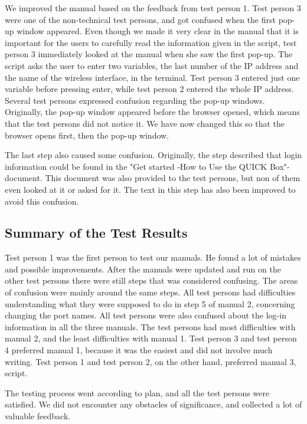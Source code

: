 We improved the manual based on the feedback from test person 1. Test person 3 were one of the non-technical test persons, and got confused when the first pop-up window appeared. Even though we made it very clear in the manual that it is important for the users to carefully read the information given in the script, test person 3 immediately looked at the manual when she saw the first pop-up. The script asks the user to enter two variables, the last number of the IP address and the name of the wireless interface, in the terminal. Test person 3 entered just one variable before pressing enter, while test person 2 entered the whole IP address. 
Several test persons expressed confusion regarding the pop-up windows. Originally, the pop-up window appeared before the browser opened, which means that the test persons did not notice it. We have now changed this so that the browser opens first, then the pop-up window. 

The last step also caused some confusion. Originally, the step described that login information could be found in the "Get started -How to Use the QUICK Box"-document. This document was also provided to the test persons, but non of them even looked at it or asked for it. The text in this step has also been improved to avoid this confusion.

\subsection{Summary of the Test Results}
Test person 1 was the first person to test our manuals. He found a lot of mistakes and possible improvements. After the manuals were updated and run on the other test persons there were still steps that was considered confusing. The areas of confusion were mainly around the same steps. All test persons had difficulties understanding what they were supposed to do in step 5 of manual 2, concerning changing the port names. All test persons were also confused about the log-in information in all the three manuals. The test persons had most difficulties with manual 2, and the least difficulties with manual 1. Test person 3 and test person 4 preferred manual 1, because it was the easiest and did not involve much writing. Test person 1 and test person 2, on the other hand, preferred manual 3, script. 

The testing process went according to plan, and all the test persons were satisfied. We did not encounter any obstacles of significance, and collected a lot of valuable feedback.  
